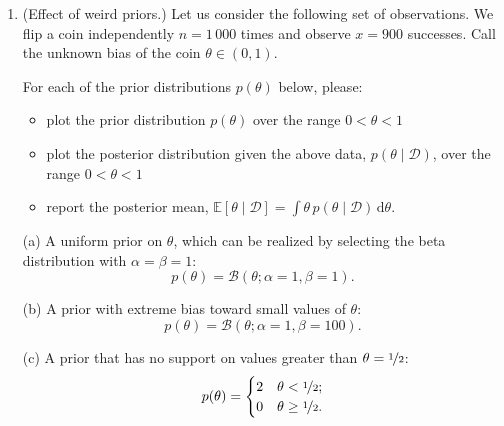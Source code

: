 \documentclass{article}
\newcommand{\given}{\mid}
\newcommand{\mc}[1]{\mathcal{#1}}
\newcommand{\data}{\mc{D}}
\newcommand{\intd}[1]{\,\mathrm{d}{#1}}
\begin{document}
\begin{enumerate}
  Consider a Bayesian analysis of $\theta$ with a beta prior $p(\theta
  \given \alpha, \beta) = \mc{B}(\theta; \alpha, \beta)$.  What is the
  posterior mean of $\theta$?  What is the posterior mode?  Consider
  $(\alpha, \beta) = (50, 50)$.  Plot the posterior density in this
  case.  Is the maximum likelihood estimator a good summary of the
  distribution?

\item
  (Effect of weird priors.)  Let us consider the following set of
  observations. We flip a coin independently $n = 1\,000$ times and
  observe $x = 900$ successes. Call the unknown bias of the coin
  $\theta \in (0, 1)$.

  For each of the prior distributions $p(\theta)$ below, please:
  \begin{itemize}
  \item
    plot the prior distribution $p(\theta)$ over the range $0 < \theta < 1$
  \item
    plot the posterior distribution given the above data, $p(\theta
    \given \data)$, over the range $0 < \theta < 1$
  \item
    report the posterior mean,
    $\mathbb{E}[\theta \given \data] = \int \theta\,p(\theta\given\data)\intd\theta.$
  \end{itemize}

  (a) A uniform prior on $\theta$, which can be realized by selecting
  the beta distribution with $\alpha = \beta = 1$:
  \[
    p(\theta) = \mathcal{B}(\theta; \alpha = 1, \beta = 1).
  \]

  (b) A prior with extreme bias toward small values of $\theta$:
  \[
    p(\theta) = \mathcal{B}(\theta; \alpha = 1, \beta = 100).
  \]

  (c) A prior that has no support on values greater than $\theta =
  \nicefrac{1}{2}$:
  \[
    p(\theta) = \begin{cases} 2 & \theta <    \nicefrac{1}{2}; \\
                              0 & \theta \geq \nicefrac{1}{2}. \end{cases}
  \]


\end{enumerate}
\end{document}
